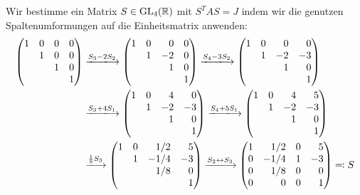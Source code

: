 Wir bestimme ein Matrix $S \in \operatorname{GL}_{4}(\mathbb{R}) $ mit $S^T A S = J$ indem wir die genutzen Spaltenumformungen auf die Einheitsmatrix anwenden:
\begingroup
\allowdisplaybreaks
\begin{align*}
  \begin{pmatrix*}[r]
    1 & 0 & 0 & 0 \\
      & 1 & 0 & 0 \\
      &   & 1 & 0  \\
      &   &   & 1
  \end{pmatrix*}
  &\xlongrightarrow{S_3 - 2 S_2}
  \begin{pmatrix*}[r]
    1 & 0 &  0  & 0 \\
      & 1 & -2  & 0 \\
      &   &  1  & 0  \\
      &   &     & 1
  \end{pmatrix*}
  \xlongrightarrow{S_4 - 3 S_2}
  \begin{pmatrix*}[r]
    1 & 0 &  0  &  0  \\
      & 1 & -2  & -3  \\
      &   &  1  &  0  \\
      &   &     &  1
  \end{pmatrix*}
  \\
  &\xlongrightarrow{S_3 + 4 S_1}
  \begin{pmatrix*}[r]
    1 & 0 &  4  &  0  \\
      & 1 & -2  & -3  \\
      &   &  1  &  0  \\
      &   &     &  1
  \end{pmatrix*}
  \xlongrightarrow{S_4 + 5 S_1}
  \begin{pmatrix*}[r]
    1  & 0 &  4 &  5  \\
       & 1 & -2 & -3  \\
       &   &  1 &  0  \\
       &   &    &  1
  \end{pmatrix*}
  \\
  &\xlongrightarrow{\frac{1}{8} S_3}
  \begin{pmatrix*}[r]
    1 & 0 &  1/2 &  5  \\
      & 1 & -1/4 & -3  \\
      &   &  1/8 &  0  \\
      &   &      &  1
  \end{pmatrix*}
  \xlongrightarrow{S_2 \leftrightarrow S_3}
  \begin{pmatrix*}[r]
    1 &  1/2  & 0 &  5  \\
    0 & -1/4  & 1 & -3  \\
    0 &  1/8  & 0 &  0  \\
    0 &  0    & 0 &  1
  \end{pmatrix*}
  \eqqcolon
  S
\end{align*}
\endgroup




